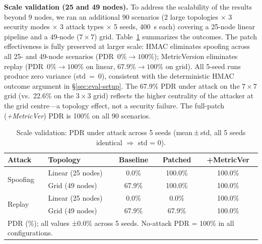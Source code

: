 \documentclass[10pt,journal,compsoc]{IEEEtran}
\begin{document}
\textbf{Scale validation (25 and 49 nodes).}
To address the scalability of the results beyond 9 nodes, we ran an
additional 90 scenarios (2 large topologies $\times$ 3 security modes
$\times$ 3 attack types $\times$ 5 seeds, 400~s each) covering a
25-node linear pipeline and a 49-node ($7\times7$) grid.
Table~\ref{tab:scale} summarizes the outcomes.
The patch effectiveness is fully preserved at larger scale:
HMAC eliminates spoofing across all 25- and 49-node scenarios
(PDR~$0\% \to 100\%$); MetricVersion eliminates replay
(PDR~$0\% \to 100\%$ on linear, $67.9\% \to 100\%$ on grid).
All 5-seed runs produce zero variance (std~=~0), consistent with
the deterministic HMAC outcome argument in §\ref{sec:eval-setup}.
The 67.9\% PDR under attack on the $7\times7$ grid (vs.\ 22.6\% on
the $3\times3$ grid) reflects the higher centrality of the attacker
at the grid centre—a topology effect, not a security failure.
The full-patch (\textit{+MetricVer}) PDR is 100\% on all 90 scenarios.

\begin{table}[h]
  \centering
  \caption{Scale validation: PDR under attack across 5 seeds
           (mean\,±\,std, all 5 seeds identical $\Rightarrow$ std = 0).}
  \label{tab:scale}
  \setlength{\tabcolsep}{4pt}
  \begin{tabular}{llccc}
    \toprule
    \textbf{Attack} & \textbf{Topology} &
      \textbf{Baseline} & \textbf{Patched} & \textbf{+MetricVer} \\
    \midrule
    \multirow{2}{*}{Spoofing}
      & Linear (25 nodes) & 0.0\% & 100.0\% & 100.0\% \\
      & Grid   (49 nodes) & 67.9\% & 100.0\% & 100.0\% \\
    \midrule
    \multirow{2}{*}{Replay}
      & Linear (25 nodes) & 0.0\% & 0.0\%  & 100.0\% \\
      & Grid   (49 nodes) & 67.9\% & 67.9\% & 100.0\% \\
    \bottomrule
    \multicolumn{5}{l}{\footnotesize PDR (\%); all values ±0.0\% across 5 seeds. No-attack PDR = 100\% in all configurations.}
  \end{tabular}
\end{table}
\end{document}
